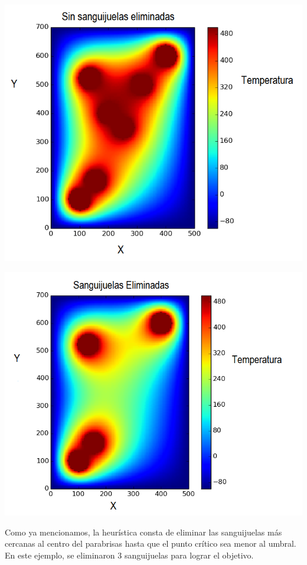 	\begin{center}
		\includegraphics[scale=0.5]{./img/test5_sinkill.png}
	\end{center}

	\begin{center}
		\includegraphics[scale=0.5]{./img/test5_conkill.png}
	\end{center}

	Como ya mencionamos, la heurística consta de eliminar las sanguijuelas más cercanas al centro del parabrisas hasta que el punto crítico sea menor al umbral. En este ejemplo, se eliminaron 3 sanguijuelas para lograr el objetivo.

